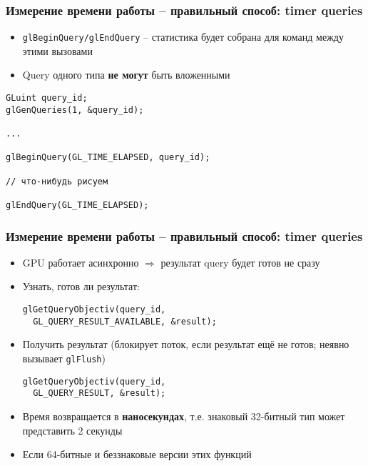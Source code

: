 \documentclass{beamer}
\begin{document}
\begin{frame}[fragile]
\frametitle{Измерение времени работы -- правильный способ: timer queries}
\begin{itemize}
\item \verb|glBeginQuery/glEndQuery| -- статистика будет собрана для команд между этими вызовами
\pause
\item Query одного типа \textbf{не могут} быть вложенными
\end{itemize}
\pause
\begin{verbatim}
GLuint query_id;
glGenQueries(1, &query_id);

...

glBeginQuery(GL_TIME_ELAPSED, query_id);

// что-нибудь рисуем

glEndQuery(GL_TIME_ELAPSED);
\end{verbatim}
\end{frame}

\begin{frame}[fragile]
\frametitle{Измерение времени работы -- правильный способ: timer queries}
\begin{itemize}
\item GPU работает асинхронно \begin{math}\Rightarrow\end{math} результат query будет готов не сразу
\pause
\item Узнать, готов ли результат:
\begin{verbatim}
glGetQueryObjectiv(query_id,
  GL_QUERY_RESULT_AVAILABLE, &result);
\end{verbatim}
\pause
\item Получить результат (блокирует поток, если результат ещё не готов; неявно вызывает \verb|glFlush|)
\begin{verbatim}
glGetQueryObjectiv(query_id,
  GL_QUERY_RESULT, &result);
\end{verbatim}
\pause
\item Время возвращается в \textbf{наносекундах}, т.е. знаковый 32-битный тип может представить 2 секунды
\pause
\item Если 64-битные и беззнаковые версии этих функций
\end{itemize}
\end{frame}
\end{document}
